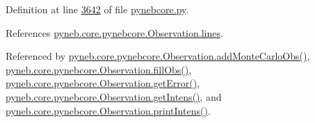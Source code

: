 Definition at line \hyperlink{pynebcore_8py_source_l03642}{3642} of file \hyperlink{pynebcore_8py_source}{pynebcore.\-py}.



References \hyperlink{pynebcore_8py_source_l03542}{pyneb.\-core.\-pynebcore.\-Observation.\-lines}.



Referenced by \hyperlink{pynebcore_8py_source_l04069}{pyneb.\-core.\-pynebcore.\-Observation.\-add\-Monte\-Carlo\-Obs()}, \hyperlink{pynebcore_8py_source_l03574}{pyneb.\-core.\-pynebcore.\-Observation.\-fill\-Obs()}, \hyperlink{pynebcore_8py_source_l03931}{pyneb.\-core.\-pynebcore.\-Observation.\-get\-Error()}, \hyperlink{pynebcore_8py_source_l03904}{pyneb.\-core.\-pynebcore.\-Observation.\-get\-Intens()}, and \hyperlink{pynebcore_8py_source_l03958}{pyneb.\-core.\-pynebcore.\-Observation.\-print\-Intens()}.


